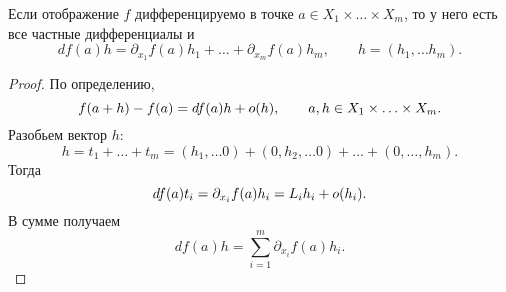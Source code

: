 % 
% 

\begin{st}
    Если отображение $ f$ дифференцируемо в точке  $ a \in  X_1 \times \ldots \times X_m$, то у него есть все частные дифференциалы и 
    \[
	df(a) h = \partial _{x_1}f(a)h_1 + \ldots + \partial _{x_{m}}f(a)h_m, \qquad h = (h_1, \ldots h_m)
    .\] 
\end{st}
\begin{proof}
    По определению, 
    \[
	f(a +h) -f(a) = df(a)h+o(h), \qquad a, h \in  X_1 \times \ldots \times X_m
    .\] 
    Разобьем вектор $ h$:
     \[
	 h = t_1 +\ldots + t_m = (h_1, \ldots 0) + (0, h_2, \ldots 0)+ \ldots +(0, \ldots , h_m)
    .\] 
    Тогда 
    \[
	df(a)t_i = \partial _{x_i}f(a)h_i = L_ih_i + o(h_i)
    .\] 
    В сумме получаем
    \[
	df(a)h = \sum_{i=1}^{m} \partial _{x_{i}}f(a)h_i
    .\] 
\end{proof}

